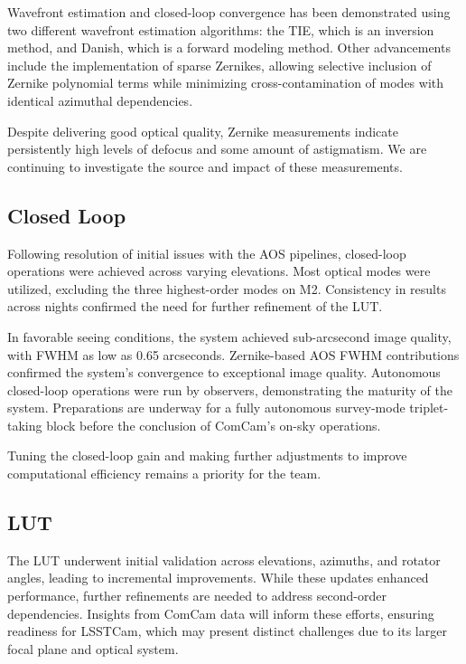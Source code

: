 Wavefront estimation and closed-loop convergence has been demonstrated using two different
wavefront estimation algorithms: the TIE, which is an inversion method, and Danish, which
is a forward modeling method. Other advancements include the implementation of sparse Zernikes, 
allowing selective inclusion of Zernike polynomial terms while minimizing cross-contamination 
of modes with identical azimuthal dependencies.

Despite delivering good optical quality, Zernike measurements indicate persistently high
levels of defocus and some amount of astigmatism. We are continuing to investigate the
source and impact of these measurements.

\subsection{Closed Loop}
Following resolution of initial issues with the AOS pipelines, 
closed-loop operations were achieved across varying elevations. 
Most optical modes were utilized, excluding the three highest-order modes on M2. 
Consistency in results across nights confirmed the need for further refinement of the LUT.

In favorable seeing conditions, the system achieved sub-arcsecond image 
quality, with FWHM as low as 0.65 arcseconds. Zernike-based AOS FWHM 
contributions confirmed the system's convergence to exceptional image 
quality. Autonomous closed-loop operations were run by observers, 
demonstrating the maturity of the system. Preparations are underway 
for a fully autonomous survey-mode triplet-taking block before the 
conclusion of ComCam's on-sky operations.

Tuning the closed-loop gain and making further adjustments to improve computational 
efficiency remains a priority for the team.

\subsection{LUT}
The LUT underwent initial validation across elevations, azimuths, and rotator angles, 
leading to incremental improvements. While these updates enhanced performance, 
further refinements are needed to address second-order dependencies. Insights 
from ComCam data will inform these efforts, ensuring readiness for LSSTCam, which 
may present distinct challenges due to its larger focal plane and optical system.

